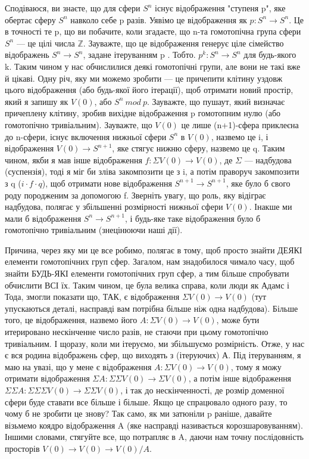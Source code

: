 Сподіваюся, ви знаєте, що для сфери $S^n$ існує відображення "ступеня p",
яке обертає сферу $S^n$ навколо себе p разів. Уявімо це відображення як
$p: S^n \rightarrow S^n$. Це в точності те p, що ви побачите, коли згадаєте,
що n-та гомотопічна група сфери $S^n$ --- це цілі числа $\mathbb{Z}$.
Зауважте, що це відображення генерує ціле сімейство відображень $S^n \rightarrow S^n$,
задане ітеруванням p . Тобто. $p^k: S^n \rightarrow S^n$ для будь-якого k.
Таким чином у нас обчислилися деякі гомотопічні групи, але вони не такі вже й цікаві.
Одну річ, яку ми можемо зробити --- це причепити клітину уздовж цього
відображення (або будь-якої його ітерації), щоб отримати новий простір,
який я запишу як $V(0)$, або $S^n\ mod\ p$. Зауважте, що пушаут, який визначає
причеплену клітину, зробив вихідне відображення p гомотопним нулю (або гомотопічно
тривіальним). Зауважте, що $V(0)$ це лише (n+1)-сфера приклеєна до n-сфери,
існує включення нижньої сфери $S^n$ в $V(0)$, назвемо це i, і відображення
$V(0) \rightarrow S^{n+1}$, яке стягує нижню сферу, назвемо це q. Таким чином,
якби я мав інше відображення $f: \Sigma V(0) \rightarrow V(0)$, де $\Sigma$ ---
надбудова (суспензія), тоді я міг би зліва закомпозити це з i, а потім
праворуч закомпозити з q ($i \cdot f \cdot q$), щоб отримати нове
відображення $S^{n+1} \rightarrow S^{n+1}$, яке було б свого роду
породженим за допомогою f. Зверніть увагу, що роль, яку відіграє
надбудова, полягає у збільшенні розмірності нижньої сфери $V(0)$. Інакше ми
мали б відображення $S^n \rightarrow S^{n+1}$, і будь-яке таке відображення було б
гомотопічно тривіальним (знецінюючи наші дії).

Причина, через яку ми це все робимо, полягає в тому, щоб просто знайти ДЕЯКІ
елементи гомотопічних груп сфер. Загалом, нам знадобилося чимало часу, щоб
знайти БУДЬ-ЯКІ елементи гомотопічних груп сфер, а тим більше спробувати
обчислити ВСІ їх. Таким чином, це була велика справа, коли люди як Адамс і Тода,
змогли показати що, ТАК, є відображення $\Sigma V(0) \rightarrow V(0)$ (тут упускаються деталі,
насправді вам потрібна більше ніж одна надбудова). Більше того, це відображення,
назвемо його $A: \Sigma V(0) \rightarrow V(0)$, може бути итерировано нескінченне
число разів, не стаючи при цьому гомотопічно тривіальним. І щоразу, коли ми ітеруємо,
ми збільшуємо розмірність. Отже, у нас є вся родина відображень сфер, що
виходять з (ітеруючих) А. Під ітеруванням, я маю на увазі, що у мене є
відображення $A: \Sigma V(0) \rightarrow V(0)$, тому я можу отримати
відображення $\Sigma A: \Sigma\Sigma V(0) \rightarrow \Sigma V(0)$,
а потім інше відображення
$\Sigma\Sigma A: \Sigma\Sigma\Sigma V(0) \rightarrow \Sigma\Sigma V(0)$, і так до нескінченності,
де розмір доменної сфери буде ставати все більше і більше. Якщо це спрацювало
одного разу, то чому б не зробити це знову? Так само, як ми затюніли p раніше,
давайте візьмемо коядро відображення A (яке насправді називається корозшаровуванням).
Іншими словами, стягуйте все, що потрапляє в A, даючи нам точну послідовність
просторів $V(0) \rightarrow V(0) \rightarrow V(0)/A$.


